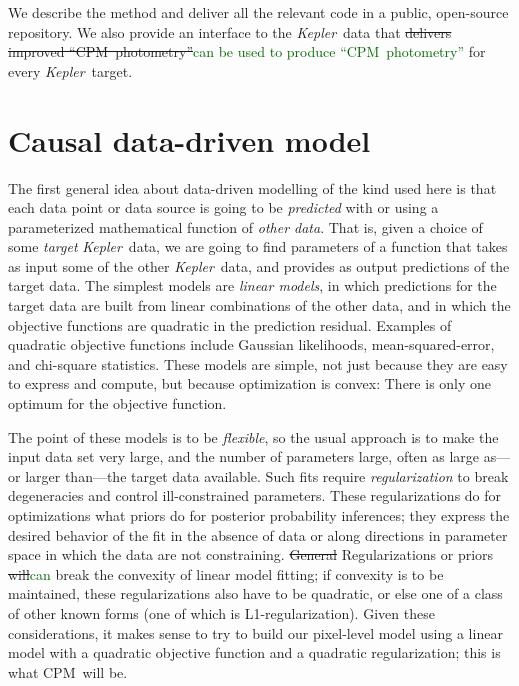 \documentclass[12pt, preprint]{aastex}
\newcommand{\project}[1]{\textsl{#1}}
\newcommand{\Kepler}{\project{Kepler}}
\newcommand{\name}{CPM}
\newcommand{\revise}[1]{\textcolor{darkgreen}{#1}}
\newcommand{\remove}[1]{\sout{#1}}
\begin{document}
We describe the method and deliver all the relevant code in a public, open-source repository.
We also provide an interface to the \Kepler\ data that \remove{delivers improved ``\name\ photometry''}\revise{can be used
to produce ``\name\ photometry''}
  for every \Kepler\ target.

\section{Causal data-driven model}

The first general idea about data-driven modelling of the kind used here
  is that each data point or data source is going to be 
  \emph{predicted} with or using a parameterized mathematical function of \emph{other data}.
That is, given a choice of some \emph{target} \Kepler\ data,
  we are going to find parameters of a function that takes as input some of the other \Kepler\ data,
  and provides as output predictions of the target data.
The simplest models are \emph{linear models},
  in which predictions for the target data are built from linear combinations of the other data,
  and in which the objective functions are quadratic in the prediction residual.
Examples of quadratic objective functions include Gaussian likelihoods, mean-squared-error, and chi-square statistics.
These models are simple,
  not just because they are easy to express and compute,
  but because optimization is convex:
There is only one optimum for the objective function.

The point of these models is to be \emph{flexible},
  so the usual approach is to make the input data set very large,
  and the number of parameters large,
  often as large as---or larger than---the target data available.
Such fits require \emph{regularization} to break degeneracies
  and control ill-constrained parameters.
These regularizations do for optimizations what priors do for posterior probability inferences;
  they express the desired behavior of the fit in the absence of data
  or along directions in parameter space in which the data are not constraining.
\remove{General} Regularizations or priors \remove{will}\revise{can} break the convexity of linear model fitting;
  if convexity is to be maintained, these regularizations also have to be quadratic,
  or else one of a class of other known forms (one of which is L1-regularization).
Given these considerations, it makes sense to try to build our pixel-level model
  using a linear model with a quadratic objective function and a quadratic regularization;
  this is what \name\ will be.
\end{document}

